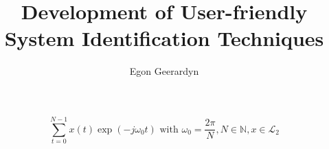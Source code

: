 \documentclass[a4paper,headings=big,chapterprefix=true]{scrbook}
\title{Development of User-friendly System Identification Techniques}
\author{Egon Geerardyn}
\begin{document}
  \frontmatter
   

   \mainmatter
   
   
   
   
   
   
   
   

   \backmatter
   
   \[
     \sum_{t=0}^{N-1} x(t) \exp(-j \omega_0 t) \text{ with } \omega_0 = \frac{2\pi}{N}, N \in \mathbb{N}, x \in \mathcal{L}_2
   \]
\end{document}
